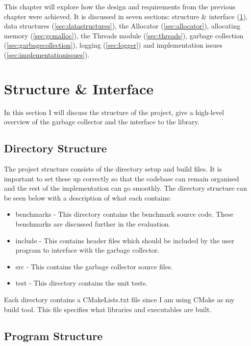 \documentclass[../diss.tex]{subfiles}
\begin{document}
This chapter will explore how the design and requirements from the previous chapter were achieved. It is discussed in seven sections: structure \& interface (\cref{sec:structureandinterface}), data structures (\cref{sec:datastructures}), the Allocator (\cref{sec:allocator}), allocating memory (\cref{sec:gcmalloc}), the Threads module (\cref{sec:threads}), garbage collection (\cref{sec:garbagecollection}), logging (\cref{sec:logger}) and implementation issues (\cref{sec:implementationissues}).

\section{Structure \& Interface}
\label{sec:structureandinterface}

In this section I will discuss the structure of the project, give a high-level overview of the garbage collector and the interface to the library.

\subsection{Directory Structure}

The project structure consists of the directory setup and build files. It is important to set these up correctly so that the codebase can remain organised and the rest of the implementation can go smoothly. The directory structure can be seen below with a description of what each contains:
\begin{itemize}
    \item benchmarks - This directory contains the benchmark source code. These benchmarks are discussed further in the evaluation.
    \item include - This contains header files which should be included by the user program to interface with the garbage collector.
    \item src - This contains the garbage collector source files.
    \item test - This directory contains the unit tests.
\end{itemize}

Each directory contains a CMakeLists.txt file since I am using CMake as my build tool. This file specifies what libraries and executables are built.

\subsection{Program Structure}
\end{document}

